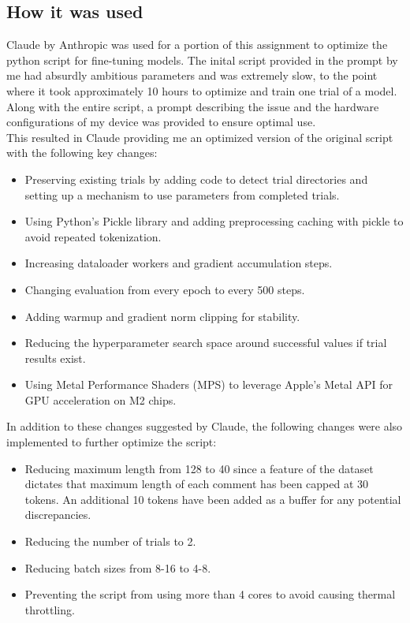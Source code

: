 \documentclass[titlepage]{article}
\begin{document}
\subsection{How it was used}
Claude by Anthropic was used for a portion of this assignment to optimize the python script for fine-tuning models. The inital script 
provided in the prompt by me had absurdly ambitious parameters and was extremely slow, to the point where it took approximately 10 hours 
to optimize and train one trial of a model. Along with the entire script, a prompt describing the issue and the hardware configurations 
of my device was provided to ensure optimal use. \\
\newline
This resulted in Claude providing me an optimized version of the original script with the following key changes:
\begin{itemize}
    \item Preserving existing trials by adding code to detect trial directories and setting up a mechanism to use parameters from completed trials.
    \item Using Python's Pickle library and adding preprocessing caching with pickle to avoid repeated tokenization.
    \item Increasing dataloader workers and gradient accumulation steps.
    \item Changing evaluation from every epoch to every 500 steps.
    \item Adding warmup and gradient norm clipping for stability.
    \item Reducing the hyperparameter search space around successful values if trial results exist.
    \item Using Metal Performance Shaders (MPS) to leverage Apple's Metal API for GPU acceleration on M2 chips.
\end{itemize}

In addition to these changes suggested by Claude, the following changes were also implemented to further optimize the script:
\begin{itemize}
    \item Reducing maximum length from 128 to 40 since a feature of the dataset dictates that maximum length of each comment has been capped 
    at 30 tokens. An additional 10 tokens have been added as a buffer for any potential discrepancies.
    \item Reducing the number of trials to 2.
    \item Reducing batch sizes from 8-16 to 4-8.
    \item Preventing the script from using more than 4 cores to avoid causing thermal throttling.
\end{itemize}
\end{document}
